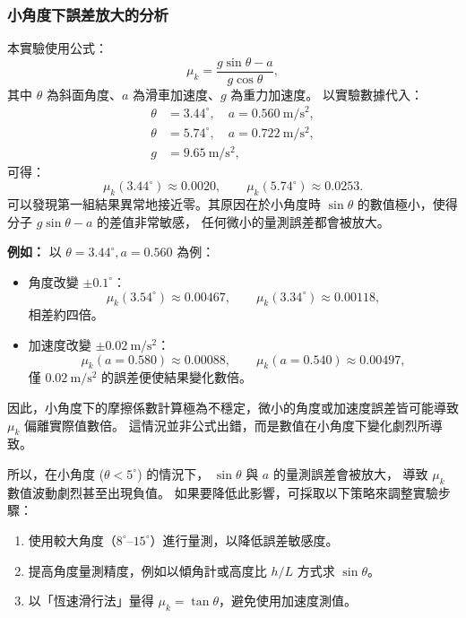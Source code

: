 \documentclass[12pt]{article}
\begin{document}
\subsubsection{小角度下誤差放大的分析}
\noindent
本實驗使用公式：
\[
\mu_k = \frac{g\sin\theta - a}{g\cos\theta},
\]
其中 $\theta$ 為斜面角度、$a$ 為滑車加速度、$g$ 為重力加速度。  
以實驗數據代入：
\[
\begin{aligned}
\theta &= 3.44^\circ, \quad a = 0.560\ \mathrm{m/s^2}, \\
\theta &= 5.74^\circ, \quad a = 0.722\ \mathrm{m/s^2}, \\
g &= 9.65\ \mathrm{m/s^2},
\end{aligned}
\]
可得：
\[
\mu_k(3.44^\circ) \approx 0.0020, \qquad
\mu_k(5.74^\circ) \approx 0.0253.
\]
可以發現第一組結果異常地接近零。其原因在於小角度時
$\sin\theta$ 的數值極小，使得分子
$g\sin\theta - a$ 的差值非常敏感，
任何微小的量測誤差都會被放大。

\noindent
\textbf{例如：}
以 $\theta = 3.44^\circ, a = 0.560$ 為例：

\begin{itemize}
    \item 角度改變 $\pm0.1^\circ$：
    \[
    \mu_k(3.54^\circ) \approx 0.00467, \qquad
    \mu_k(3.34^\circ) \approx 0.00118,
    \]
    相差約四倍。
    \item 加速度改變 $\pm0.02\ \mathrm{m/s^2}$：
    \[
    \mu_k(a=0.580) \approx 0.00088, \qquad
    \mu_k(a=0.540) \approx 0.00497,
    \]
    僅 $0.02\ \mathrm{m/s^2}$ 的誤差便使結果變化數倍。
\end{itemize}

因此，小角度下的摩擦係數計算極為不穩定，微小的角度或加速度誤差皆可能導致 $\mu_k$ 偏離實際值數倍。
這情況並非公式出錯，而是數值在小角度下變化劇烈所導致。

\vspace{1em}
\noindent
所以，在小角度 ($\theta < 5^\circ$) 的情況下，
$\sin\theta$ 與 $a$ 的量測誤差會被放大，
導致 $\mu_k$ 數值波動劇烈甚至出現負值。
如果要降低此影響，可採取以下策略來調整實驗步驟：

\begin{enumerate}
    \item 使用較大角度（$8^\circ$–$15^\circ$）進行量測，以降低誤差敏感度。
    \item 提高角度量測精度，例如以傾角計或高度比 $h/L$ 方式求 $\sin\theta$。
    \item 以「恆速滑行法」量得 $\mu_k = \tan\theta$，避免使用加速度測值。
\end{enumerate}
\end{document}
